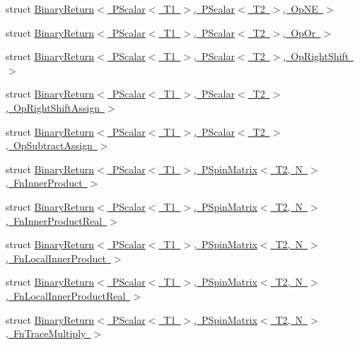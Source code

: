 \begin{DoxyCompactItemize}
\item 
struct \mbox{\hyperlink{structENSEM_1_1BinaryReturn_3_01PScalar_3_01T1_01_4_00_01PScalar_3_01T2_01_4_00_01OpNE_01_4}{Binary\+Return$<$ P\+Scalar$<$ T1 $>$, P\+Scalar$<$ T2 $>$, Op\+N\+E $>$}}
\item 
struct \mbox{\hyperlink{structENSEM_1_1BinaryReturn_3_01PScalar_3_01T1_01_4_00_01PScalar_3_01T2_01_4_00_01OpOr_01_4}{Binary\+Return$<$ P\+Scalar$<$ T1 $>$, P\+Scalar$<$ T2 $>$, Op\+Or $>$}}
\item 
struct \mbox{\hyperlink{structENSEM_1_1BinaryReturn_3_01PScalar_3_01T1_01_4_00_01PScalar_3_01T2_01_4_00_01OpRightShift_01_4}{Binary\+Return$<$ P\+Scalar$<$ T1 $>$, P\+Scalar$<$ T2 $>$, Op\+Right\+Shift $>$}}
\item 
struct \mbox{\hyperlink{structENSEM_1_1BinaryReturn_3_01PScalar_3_01T1_01_4_00_01PScalar_3_01T2_01_4_00_01OpRightShiftAssign_01_4}{Binary\+Return$<$ P\+Scalar$<$ T1 $>$, P\+Scalar$<$ T2 $>$, Op\+Right\+Shift\+Assign $>$}}
\item 
struct \mbox{\hyperlink{structENSEM_1_1BinaryReturn_3_01PScalar_3_01T1_01_4_00_01PScalar_3_01T2_01_4_00_01OpSubtractAssign_01_4}{Binary\+Return$<$ P\+Scalar$<$ T1 $>$, P\+Scalar$<$ T2 $>$, Op\+Subtract\+Assign $>$}}
\item 
struct \mbox{\hyperlink{structENSEM_1_1BinaryReturn_3_01PScalar_3_01T1_01_4_00_01PSpinMatrix_3_01T2_00_01N_01_4_00_01FnInnerProduct_01_4}{Binary\+Return$<$ P\+Scalar$<$ T1 $>$, P\+Spin\+Matrix$<$ T2, N $>$, Fn\+Inner\+Product $>$}}
\item 
struct \mbox{\hyperlink{structENSEM_1_1BinaryReturn_3_01PScalar_3_01T1_01_4_00_01PSpinMatrix_3_01T2_00_01N_01_4_00_01FnInnerProductReal_01_4}{Binary\+Return$<$ P\+Scalar$<$ T1 $>$, P\+Spin\+Matrix$<$ T2, N $>$, Fn\+Inner\+Product\+Real $>$}}
\item 
struct \mbox{\hyperlink{structENSEM_1_1BinaryReturn_3_01PScalar_3_01T1_01_4_00_01PSpinMatrix_3_01T2_00_01N_01_4_00_01FnLocalInnerProduct_01_4}{Binary\+Return$<$ P\+Scalar$<$ T1 $>$, P\+Spin\+Matrix$<$ T2, N $>$, Fn\+Local\+Inner\+Product $>$}}
\item 
struct \mbox{\hyperlink{structENSEM_1_1BinaryReturn_3_01PScalar_3_01T1_01_4_00_01PSpinMatrix_3_01T2_00_01N_01_4_00_01FnLocalInnerProductReal_01_4}{Binary\+Return$<$ P\+Scalar$<$ T1 $>$, P\+Spin\+Matrix$<$ T2, N $>$, Fn\+Local\+Inner\+Product\+Real $>$}}
\item 
struct \mbox{\hyperlink{structENSEM_1_1BinaryReturn_3_01PScalar_3_01T1_01_4_00_01PSpinMatrix_3_01T2_00_01N_01_4_00_01FnTraceMultiply_01_4}{Binary\+Return$<$ P\+Scalar$<$ T1 $>$, P\+Spin\+Matrix$<$ T2, N $>$, Fn\+Trace\+Multiply $>$}}

\end{DoxyCompactItemize}
